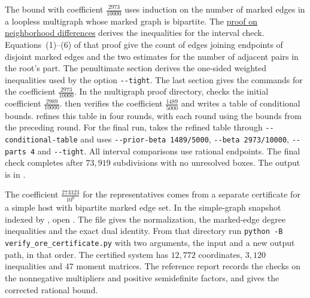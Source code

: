 \documentclass[preprint,11pt,numbers]{elsarticle-arxiv}
\numberwithin{equation}{section}
\theoremstyle{definition}
\begin{document}
The bound with coefficient $\frac{2973}{10000}$ uses induction on the
number of marked edges in a loopless multigraph whose marked graph is
bipartite. The
\href{https://github.com/rewere143-cell/fgst-strong-clique/blob/v1.0.0/reproducibility/multigraph/\%E4\%B8\%80\%E8\%88\%AC\%E6\%97\%A0\%E7\%8E\%AF\%E5\%A4\%9A\%E9\%87\%8D\%E5\%9B\%BE\%E7\%9A\%84\%E6\%8E\%A8\%E5\%B9\%BF/\%E4\%BA\%8C\%E9\%83\%A8\%E6\%A0\%87\%E8\%AE\%B0\%E8\%A7\%81\%E8\%AF\%81\%E4\%BA\%8F\%E6\%8D\%9F\%E4\%B8\%8E\%E9\%82\%BB\%E5\%9F\%9F\%E5\%B7\%AE.md}{proof on neighborhood differences}
derives the inequalities for the interval check. Equations~(1)--(6)
of that proof give the count of edges joining endpoints of disjoint
marked edges and the two estimates for the number of adjacent pairs
in the root's part. The penultimate section derives the one-sided
weighted inequalities used by the option \verb|--tight|. The last
section gives the commands for the coefficient $\frac{2973}{10000}$.
In the
multigraph proof directory, 
checks the initial coefficient $\frac{2989}{10000}$.
 then verifies the coefficient
$\frac{1489}{5000}$ and writes a table of conditional bounds.
 refines this table in four
rounds, with each round using the bounds from the preceding round.
For the final run,  takes
the refined table through \verb|--conditional-table| and uses
\verb|--prior-beta 1489/5000|, \verb|--beta 2973/10000|,
\verb|--parts 4| and \verb|--tight|. All interval comparisons use
rational endpoints. The final check completes after $73{,}919$
subdivisions with no unresolved boxes. The output is in
.

The coefficient $\frac{273323}{10^6}$ for the representatives comes
from a separate certificate for a simple host with bipartite marked
edge set. In the simple-graph snapshot indexed by
, open
. The file
 gives the normalization, the
marked-edge degree inequalities and the exact dual identity.
From that directory run \texttt{python -B verify\_ore\_certificate.py}
with two arguments, the input 
and a new output path, in that order.
The certified system has $12{,}772$ coordinates, $3{,}120$ inequalities
and $47$ moment matrices. The reference report
 records the checks on the
nonnegative multipliers and positive semidefinite factors, and gives
the corrected rational bound.
\relax\space%
\end{document}
